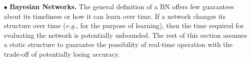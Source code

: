 \documentclass[conference]{IEEEtran}
\begin{document}
%
%

$\bullet$ {\bf Bayesian Networks.}
The general definition of a BN offers few guarantees about its timeliness or how it can learn over time. If a network changes its structure over time (\emph{e.g.}, for the purpose of learning), then the time required for evaluating the network is potentially unbounded. The rest of this section assumes a static structure to guarantee the possibility of real-time operation with the trade-off of potentially losing accuracy.
\end{document}
